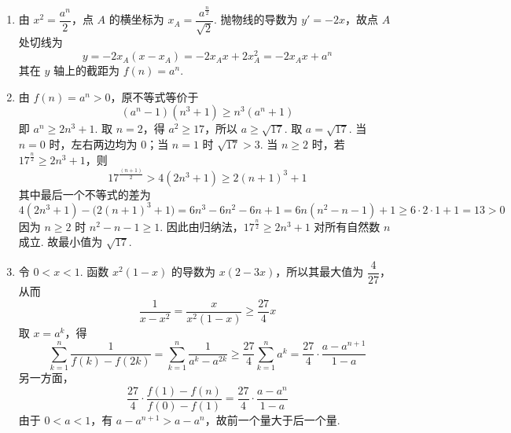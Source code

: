 \begin{solution}
\begin{enumerate}
\item 由 \(x^2=\dfrac{a^n}{2}\)，点 \(A\) 的横坐标为 \(x_A=\dfrac{a^{\frac{n}{2}}}{\sqrt2}\). 抛物线的导数为 \(y'=-2x\)，故点 \(A\) 处切线为
\[
y=-2x_A(x-x_A)=-2x_Ax+2x_A^2=-2x_Ax+a^n
\]
其在 \(y\) 轴上的截距为 \(f(n)=a^n\).
\item 由 \(f(n)=a^n>0\)，原不等式等价于
\[
(a^n-1)(n^3+1)\geqslant n^3(a^n+1)
\]
即 \(a^n\geqslant2n^3+1\). 取 \(n=2\)，得 \(a^2\geqslant17\)，所以 \(a\geqslant\sqrt{17}\).
取 \(a=\sqrt{17}\). 当 \(n=0\) 时，左右两边均为 \(0\)；当 \(n=1\) 时 \(\sqrt{17}>3\). 当 \(n\geqslant2\) 时，若 \(17^{\frac{n}{2}}\geqslant2n^3+1\)，则
\[
17^{\frac{(n+1)}{2}}>4(2n^3+1)\geqslant2(n+1)^3+1
\]
其中最后一个不等式的差为
\[
4(2n^3+1)-\bigl(2(n+1)^3+1\bigr)
=6n^3-6n^2-6n+1
=6n(n^2-n-1)+1
\geqslant6\cdot2\cdot1+1=13>0
\]
因为 \(n\geqslant2\) 时 \(n^2-n-1\geqslant1\). 因此由归纳法，\(17^{\frac{n}{2}}\geqslant2n^3+1\) 对所有自然数 \(n\) 成立. 故最小值为 \(\sqrt{17}\).
\item 令 \(0<x<1\). 函数 \(x^2(1-x)\) 的导数为 \(x(2-3x)\)，所以其最大值为 \(\dfrac4{27}\)，从而
\[
\frac1{x-x^2}=\frac{x}{x^2(1-x)}\geqslant\frac{27}{4}x
\]
取 \(x=a^k\)，得
\[
\sum_{k=1}^{n}\frac1{f(k)-f(2k)}
 =\sum_{k=1}^{n}\frac1{a^k-a^{2k}}
 \geqslant\frac{27}{4}\sum_{k=1}^{n}a^k
 =\frac{27}{4}\cdot\frac{a-a^{n+1}}{1-a}
\]
另一方面，
\[
\frac{27}{4}\cdot\frac{f(1)-f(n)}{f(0)-f(1)}
 =\frac{27}{4}\cdot\frac{a-a^n}{1-a}
\]
由于 \(0<a<1\)，有 \(a-a^{n+1}>a-a^n\)，故前一个量大于后一个量.
\end{enumerate}
\end{solution}
